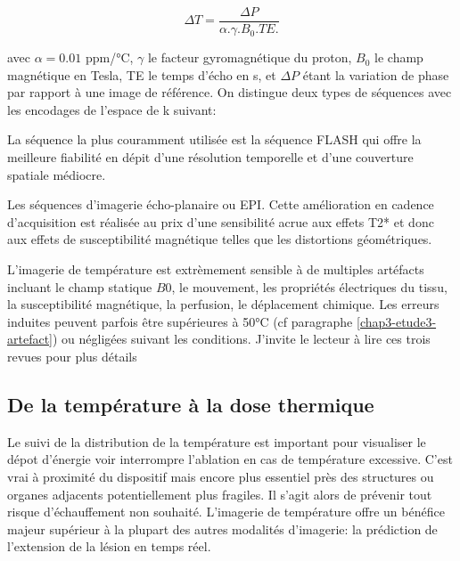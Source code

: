 \documentclass[10pt,a4paper]{report}
\begin{document}
\[
\Delta T= \frac{\Delta P}{\alpha.\gamma.B_{0}.TE.}
\]

avec $\alpha=0.01$ ppm/°C, $\gamma$ le facteur gyromagnétique du proton, $B_{0}$ le champ magnétique en Tesla, TE le temps d'écho en s, et $\Delta P$ étant la variation de phase par rapport à une image de référence. On distingue deux types de séquences avec les encodages de l'espace de k suivant:

\begin{description}
\item La séquence la plus couramment utilisée est la séquence \ac{FLASH} qui offre la meilleure fiabilité en dépit d'une résolution temporelle et d'une couverture spatiale médiocre.
\item Les séquences d'imagerie écho-planaire ou \ac{EPI}. Cette amélioration en cadence d'acquisition est réalisée au prix d'une sensibilité acrue aux effets T2* et donc aux effets de susceptibilité magnétique telles que les distortions géométriques.
\end{description}

L'imagerie de température est extrèmement sensible à de multiples artéfacts incluant le champ statique $B0$, le mouvement, les propriétés électriques du tissu, la susceptibilité magnétique, la perfusion, le déplacement chimique. Les erreurs induites peuvent parfois être supérieures à 50°C (cf paragraphe \ref{chap3-etude3-artefact}) ou négligées suivant les conditions. J'invite le lecteur à lire ces trois revues pour plus détails \cite{winter2016magnetic,odeen2019magnetic,lutz2020contactless}

\subsection{De la température à la dose thermique}

Le suivi de la distribution de la température est important pour visualiser le dépot d'énergie voir interrompre l'ablation en cas de température excessive. C'est vrai à proximité du dispositif mais encore plus essentiel près des structures ou organes adjacents potentiellement plus fragiles. Il s'agit alors de prévenir tout risque d'échauffement non souhaité. L'imagerie de température offre un bénéfice majeur supérieur à la plupart des autres modalités d'imagerie: la prédiction de l'extension de la lésion en temps réel.\\
\end{document}
